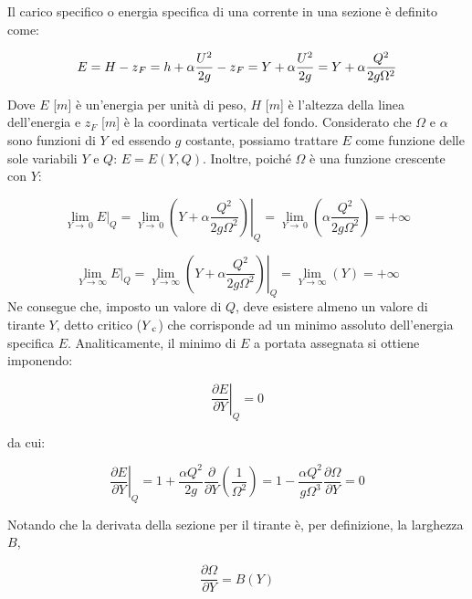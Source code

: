 \documentclass[12pt]{article} %
\begin{document}
\noindent Il carico specifico o energia specifica di una corrente in una sezione è definito come:

\begin{equation}
    E=H-z\textsubscript{$F$}=h+\alpha\frac{U^{2}}{2g}-z\textsubscript{$F$}=Y+\alpha\frac{U^{2}}{2g}=Y+\alpha\frac{Q^{2}}{2g\Omega^{2}}
    \label{eqn:E_1}
\end{equation}

\noindent Dove $E$ [$m$] è un’energia per unità di peso, $H$ [$m$] è l’altezza della linea dell’energia e $z_F$ [$m$] è la coordinata verticale del fondo.
Considerato che $\Omega$ e $\alpha$ sono funzioni di $Y$ ed essendo $g$ costante, possiamo trattare $E$ come funzione delle sole variabili $Y$ e $Q$: $E=E(Y, Q)$.
Inoltre, poiché $\Omega$ è una funzione crescente con $Y$: 

\begin{equation}
    \lim_{Y\to\ 0} E|_{Q}=\lim_{Y\to\ 0} \left.\left(Y+\alpha\frac{Q^{2}}{2g\Omega^{2}}\right)\right|_{Q}=\lim_{Y\to\ 0} \left(\alpha \frac{Q^{2}}{2g\Omega^{2}}\right)= +\infty
    \label{eqn:E_2}
\end{equation}

\begin{equation}
    \lim_{Y\to\infty} E|_Q=\lim_{Y\to\infty} \left.\left(Y+\alpha\frac{Q^{2}}{2g\Omega^{2}}\right)\right|_Q=\lim_{Y\to\infty} (Y)= +\infty
    \label{eqn:E_3}
\end{equation}
Ne consegue che, imposto un valore di $Q$, deve esistere almeno un valore di tirante $Y$, detto critico ($Y\textsubscript{c}$) che corrisponde ad un minimo assoluto dell’energia specifica $E$.
Analiticamente, il minimo di $E$ a portata assegnata si ottiene imponendo:

\begin{equation}
    \left.\frac{\partial E}{\partial Y}\right|_Q=0
    \label{eqn:E_4}
\end{equation}

\noindent da cui:

\begin{equation}
    \left.\frac{\partial E}{\partial Y}\right|_Q=1+\frac{\alpha Q^2}{2g}\frac{\partial}{\partial Y}\left(\frac{1}{\Omega^{2}}\right)=1-\frac{\alpha Q^{2}}{g\Omega^{3}}\frac{\partial \Omega}{\partial Y}=0
    \label{eqn:E_5}
\end{equation}

\noindent Notando che la derivata della sezione per il tirante è, per definizione, la larghezza $B$,

\begin{equation}
    \frac{\partial \Omega}{\partial Y}=B(Y)
    \label{eqn:B}
\end{equation}
\end{document}
